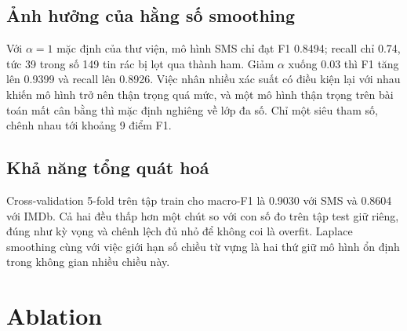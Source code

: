 \documentclass[11pt,a4paper]{article}
\begin{document}
\subsection{Ảnh hưởng của hằng số smoothing}

Với $\alpha = 1$ mặc định của thư viện, mô hình SMS chỉ đạt F1 0.8494; recall chỉ 0.74, tức 39 trong số 149 tin rác bị lọt qua thành ham. Giảm $\alpha$ xuống 0.03 thì F1 tăng lên 0.9399 và recall lên 0.8926. Việc nhân nhiều xác suất có điều kiện lại với nhau khiến mô hình trở nên thận trọng quá mức, và một mô hình thận trọng trên bài toán mất cân bằng thì mặc định nghiêng về lớp đa số. Chỉ một siêu tham số, chênh nhau tới khoảng 9 điểm F1.

\subsection{Khả năng tổng quát hoá}

Cross-validation 5-fold trên tập train cho macro-F1 là 0.9030 với SMS và 0.8604 với IMDb. Cả hai đều thấp hơn một chút so với con số đo trên tập test giữ riêng, đúng như kỳ vọng và chênh lệch đủ nhỏ để không coi là overfit. Laplace smoothing cùng với việc giới hạn số chiều từ vựng là hai thứ giữ mô hình ổn định trong không gian nhiều chiều này.

\section{Ablation}\label{sec:ablation}
\end{document}
